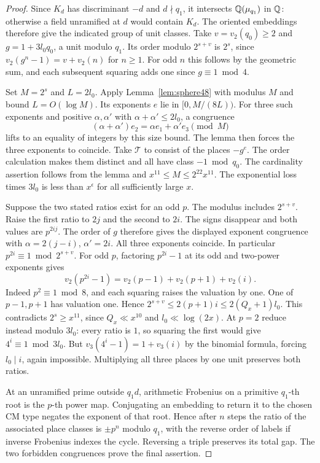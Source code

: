 \documentclass[a4paper,11pt]{article}
\theoremstyle{definition}
\theoremstyle{remark}
\numberwithin{equation}{section}
\begin{document}
\begin{proof}
Since \(K_d\) has discriminant \(-d\) and \(d\nmid q_1\),
it intersects \(\mathbb Q(\mu_{q_1})\) in \(\mathbb Q\): otherwise a
field unramified at \(d\) would contain \(K_d\).
The oriented embeddings therefore give the indicated
group of unit classes. Take \(v=v_2(q_0)\ge2\) and
\(g=1+3l_0q_0\), a unit modulo \(q_1\).
Its order modulo \(2^{s+v}\) is \(2^s\), since
\(v_2(g^n-1)=v+v_2(n)\) for \(n\ge1\). For odd \(n\)
this follows by the geometric sum, and each subsequent
squaring adds one since \(g\equiv1\bmod4\).

Set \(M=2^s\) and \(L=2l_0\). Apply
Lemma~\ref{lem:sphere48} with modulus \(M\) and bound
\(L=O(\log M)\). Its exponents \(e\) lie in
\([0,M/(8L))\). For three such exponents and positive
\(\alpha,\alpha'\) with \(\alpha+\alpha'\le2l_0\), a
congruence
\[
     (\alpha+\alpha')e_2=\alpha e_1+\alpha'e_3\pmod M
\]
lifts to an equality of integers by this size bound.
The lemma then forces the three exponents to coincide.
Take \(\mathcal T\) to consist of the places \(-g^e\).
The order calculation makes them distinct and all have
class \(-1\bmod q_0\). The cardinality assertion follows
from the lemma and \(x^{11}\le M\le 2^{22}x^{11}\).
The exponential loss times \(3l_0\) is less than
\(x^\epsilon\) for all sufficiently large \(x\).

Suppose the two stated ratios exist for an odd \(p\).
The modulus includes \(2^{s+v}\). Raise the first ratio
to \(2j\) and the second to \(2i\). The signs disappear
and both values are \(p^{2ij}\). The order of \(g\)
therefore gives the displayed exponent congruence with
\(\alpha=2(j-i)\), \(\alpha'=2i\). All three exponents
coincide. In particular \(p^{2i}\equiv1\bmod 2^{s+v}\).
For odd \(p\), factoring \(p^{2i}-1\) at its odd and
two-power exponents gives
\[
 v_2(p^{2i}-1)=v_2(p-1)+v_2(p+1)+v_2(i).
\]
Indeed \(p^2\equiv1\bmod8\), and each squaring raises
the valuation by one. One of \(p-1,p+1\) has valuation
one. Hence \(2^{s+v}\le 2(p+1)i\le2(Q_x+1)l_0\).
This contradicts \(2^s\ge x^{11}\), since \(Q_x\ll x^{10}\)
and \(l_0\ll\log(2x)\). At \(p=2\) reduce instead
modulo \(3l_0\): every ratio is \(1\), so squaring the
first would give \(4^i\equiv1\bmod 3l_0\).
But \(v_3(4^i-1)=1+v_3(i)\) by the binomial formula,
forcing \(l_0\mid i\), again impossible. Multiplying all
three places by one unit preserves both ratios.

At an unramified prime outside \(q_1d\), arithmetic
Frobenius on a primitive \(q_1\)-th root is the
\(p\)-th power map. Conjugating an embedding to return it
to the chosen CM type negates the exponent of that root.
Hence after \(n\) steps the ratio of the associated
place classes is \(\pm p^n\) modulo \(q_1\), with the
reverse order of labels if inverse Frobenius indexes
the cycle. Reversing a triple preserves its total gap.
The two forbidden congruences prove the final assertion.
\end{proof}
\end{document}
